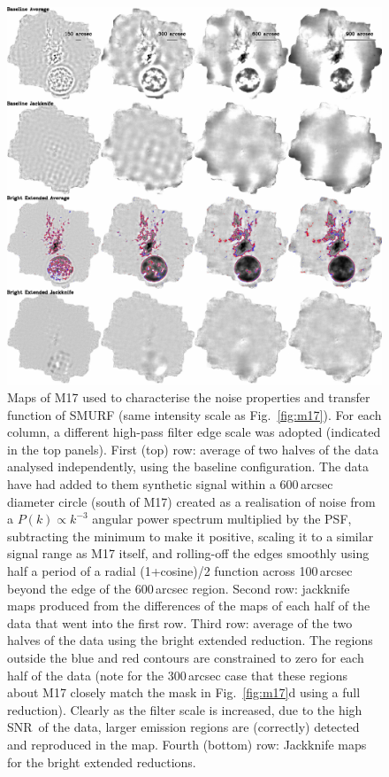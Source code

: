\documentclass[useAMS,usenatbib,nofootinbib]{mn2e}
\newcommand{\snr}{SNR}
\begin{document}
\begin{figure}
\centering
\includegraphics[width=\linewidth]{m17_jk}
\caption{Maps of M17 used to characterise the noise properties and
transfer function of SMURF (same intensity scale as
Fig.~\ref{fig:m17}). For each column, a different high-pass filter
edge scale was adopted (indicated in the top panels). First (top) row:
average of two halves of the data analysed independently, using the
baseline configuration. The data have had added to them synthetic
signal within a 600\,arcsec diameter circle (south of M17) created as
a realisation of noise from a $P(k) \propto k^{-3}$ angular power
spectrum multiplied by the PSF, subtracting the minimum to make it
positive, scaling it to a similar signal range as M17 itself, and
rolling-off the edges smoothly using half a period of a radial
(1+cosine)/2 function across 100\,arcsec beyond the edge of the
600\,arcsec region. Second row: jackknife maps produced from the
differences of the maps of each half of the data that went into the
first row. Third row: average of the two halves of the data using the
bright extended reduction. The regions outside the blue and red
contours are constrained to zero for each half of the data (note for
the 300\,arcsec case that these regions about M17 closely match the
mask in Fig.~\ref{fig:m17}d using a full reduction). Clearly as the
filter scale is increased, due to the high \snr\ of the data, larger
emission regions are (correctly) detected and reproduced in the
map. Fourth (bottom) row: Jackknife maps for the bright extended
reductions.}
\label{fig:m17_jk}
\end{figure}
\end{document}
